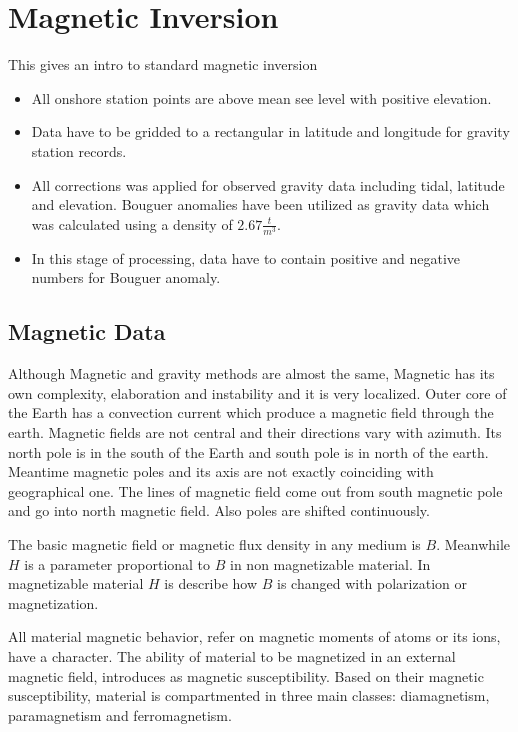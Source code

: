 \chapter{Magnetic Inversion}\label{Chp:cook:magnetic inversion}
This gives an intro to standard magnetic inversion


\begin{itemize}
\item All onshore station points are above mean see level with positive
elevation.

\item Data have to be gridded to a rectangular in latitude and longitude
for gravity station records.

\item All corrections was applied for observed gravity data including
tidal, latitude and elevation. Bouguer anomalies have been utilized as
gravity data which was calculated using a density of $2.67 \frac{t}{m^3}$.

\item In this stage of processing, data have to contain positive and
negative numbers for Bouguer anomaly.
\end{itemize}

\section{Magnetic Data} 

Although Magnetic and gravity methods are almost the same, Magnetic has its own complexity, elaboration and instability and it is very localized. Outer core of the Earth has a convection current which produce a magnetic field through the earth. Magnetic fields are not central and their directions vary with azimuth. Its north pole is in the south of the Earth and south pole is in north of the earth. Meantime magnetic poles and its axis are not exactly coinciding with geographical one. The lines of magnetic field come out from south magnetic pole and go into north magnetic field. Also poles are shifted continuously.

The basic magnetic field or magnetic flux density in any medium is $B$. Meanwhile $H$ is a parameter proportional to $B$ in non magnetizable material. In magnetizable material $H$ is describe how $B$ is changed with polarization or magnetization.

All material magnetic behavior, refer on magnetic moments of atoms or its ions, have a character. The ability of material to be magnetized in an external magnetic field, introduces as magnetic susceptibility. Based on their magnetic susceptibility, material is compartmented in three main classes: diamagnetism, paramagnetism and ferromagnetism.

